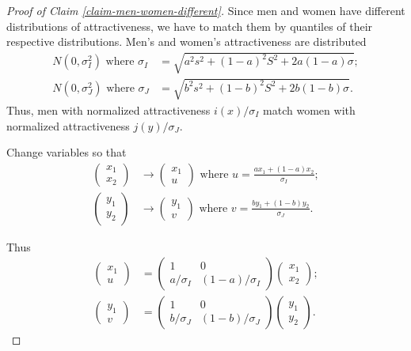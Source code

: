 \documentclass[
  12pt,
]{article}
\theoremstyle{definition}
\theoremstyle{definition}
\theoremstyle{definition}
\theoremstyle{definition}
\theoremstyle{remark}
\begin{document}
\begin{proof}[Proof of Claim \ref{claim-men-women-different}]

Since men and women have different distributions of attractiveness,
we have to match them by quantiles of their respective distributions. 
Men's and women's attractiveness are distributed
\begin{align*}
N(0,\sigma_{I}^{2})\textrm{ where }\sigma_{I} & =\sqrt{a^{2}s^{2}+(1-a)^{2}S^{2}+2a(1-a)\sigma};\\
N(0,\sigma_{J}^{2})\textrm{ where }\sigma_{J} & =\sqrt{b^{2}s^{2}+(1-b)^{2}S^{2}+2b(1-b)\sigma}.
\end{align*}
Thus, men with normalized attractiveness $i(x)/\sigma_{I}$ match
women with normalized attractiveness $j(y)/\sigma_{J}$.

Change variables so that 
\begin{align*}
\left(\begin{array}{c}
x_{1}\\
x_{2}
\end{array}\right) & \rightarrow\left(\begin{array}{c}
x_{1}\\
u
\end{array}\right)\textrm{ where }u=\frac{ax_{1}+(1-a)x_{2}}{\sigma_{I}};\\
\left(\begin{array}{c}
y_{1}\\
y_{2}
\end{array}\right) & \rightarrow\left(\begin{array}{c}
y_{1}\\
v
\end{array}\right)\textrm{ where }v=\frac{by_{1}+(1-b)y_{2}}{\sigma_{J}}.
\end{align*}

Thus 
\begin{align*}
\left(\begin{array}{c}
x_{1}\\
u
\end{array}\right) & =\left(\begin{array}{cc}
1 & 0\\
a/\sigma_{I} & (1-a)/\sigma_{I}
\end{array}\right)\left(\begin{array}{c}
x_{1}\\
x_{2}
\end{array}\right);\\
\left(\begin{array}{c}
y_{1}\\
v
\end{array}\right) & =\left(\begin{array}{cc}
1 & 0\\
b/\sigma_{J} & (1-b)/\sigma_{J}
\end{array}\right)\left(\begin{array}{c}
y_{1}\\
y_{2}
\end{array}\right).
\end{align*}


\end{proof}
\end{document}
